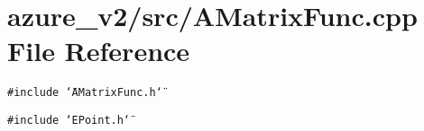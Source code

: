 \section{azure\_\-v2/src/AMatrix\-Func.cpp File Reference}
\label{AMatrixFunc_8cpp}
{\tt \#include \char`\"{}AMatrix\-Func.h\char`\"{}}\par
{\tt \#include \char`\"{}EPoint.h\char`\"{}}\par
